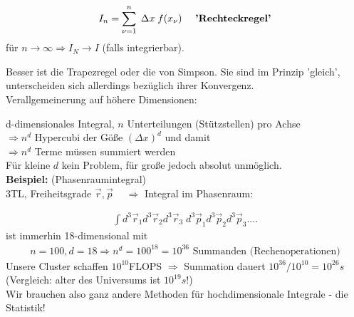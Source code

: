 \documentclass[12pt]{article}
\begin{document}
\begin{align}
I_n= \sum_{\nu =1}^n \; \Delta x \; f(x_\nu) \quad \mbox{ \textbf{'Rechteckregel'}}
\end{align}
für $n \to \infty \Rightarrow I_N \to I$ (falls integrierbar).

Besser ist die Trapezregel oder die von Simpson. Sie sind im Prinzip 'gleich', unterscheiden sich allerdings bezüglich ihrer Konvergenz. \\

Verallgemeinerung auf höhere Dimensionen:

d-dimensionales Integral, $n$ Unterteilungen (Stützstellen) pro Achse \\
$\Rightarrow n^d$ Hypercubi der Göße $(\Delta x)^d$ und damit \\
$\Rightarrow n^d$ Terme müssen summiert werden\\
Für kleine $d$ kein Problem, für große jedoch absolut unmöglich. \\

\textbf{Beispiel:} (Phasenraumintegral) \\
 3TL, Freiheitsgrade $\vec{r}, \vec{p} \; \quad \Rightarrow$ Integral im Phasenraum: 

\begin{align*}
\int d^3 \vec{r}_1 d^3 \vec{r}_2 d^3 \vec{r}_3 \; d^3 \vec{p}_1 d^3 \vec{p}_2 d^3 \vec{p}_3 .... 
\end{align*} %
ist immerhin 18-dimensional mit 
\begin{align*}
 n=100, d=18 \Rightarrow n^d=100^{18}=10^{36} \mbox{ Summanden (Rechenoperationen)}
\end{align*} 
Unsere Cluster schaffen $10^{10}$FLOPS
$\Rightarrow$ Summation dauert $10^{36 } / 10^{10}= 10^{26}s$ \\ (Vergleich: alter des Universums ist $10^{19}s$!) \\
Wir brauchen also ganz andere Methoden für hochdimensionale Integrale - die Statistik! 
\end{document}
